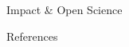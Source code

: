\documentclass[final]{beamer}
\newlength{\sepwidth}
\newlength{\colwidth}
\newcommand{\separatorcolumn}{\begin{column}{\sepwidth}\end{column}}
\begin{document}
\begin{frame}[t]
\begin{columns}[t]
\begin{column}{\colwidth}
\begin{block}{Impact \& Open Science}
  \end{block}

  \begin{block}{References}

    \nocite{*}
    \scriptsize{}

  \end{block}

\end{column}

\separatorcolumn
\end{columns}
\end{frame}
\end{document}
